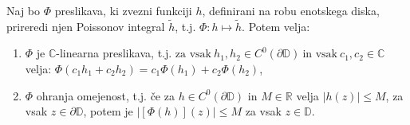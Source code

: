 \documentclass[mat1]{fmfdelo}
\begin{document}
     \begin{trditev}
        \label{lastpi}
        Naj bo $\Phi$ preslikava, ki zvezni funkciji $h$, definirani na robu enotskega diska, prireredi njen Poissonov integral $\widetilde{h}$, t.j. $\Phi : h \mapsto \widetilde{h}$.
        Potem velja:
        \begin{enumerate}[label={\alph*)}]
            \item $\Phi$ je $\mathbb{C}$-linearna preslikava, t.j. \mbox{$\text{za vsak}~h_1,h_2 \in C^0(\partial \mathbb{D})~\text{in vsak}~c_1,c_2 \in \mathbb{C}$} velja: $\Phi(c_1 h_1 + c_2 h_2) = c_1 \Phi(h_1) + c_2 \Phi(h_2)$,
            \item $\Phi$ ohranja omejenost, t.j. če za $h \in C^0(\partial \mathbb{D})$ in $M \in \mathbb{R}$ velja $|h(z)| \leq M$, za vsak $z \in \partial \mathbb{D}$, potem je $|[\Phi(h)](z)| \leq M$ za vsak $z \in \mathbb{D}$.
        \end{enumerate}
     \end{trditev}
\end{document}
